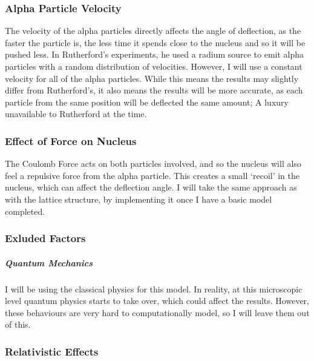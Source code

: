 \documentclass[11pt]{article}
\begin{document}
\hypertarget{alpha-particle-velocity}{%
\subsubsection*{Alpha Particle Velocity}\label{alpha-particle-velocity}}
%
The velocity of the alpha particles directly affects the angle of
deflection, as the faster the particle is, the less time it spends close
to the nucleus and so it will be pushed less. In Rutherford's
experiments, he used a radium source to emit alpha particles with a
random distribution of velocities. However, I will use a constant
velocity for all of the alpha particles. While this means the results
may slightly differ from Rutherford's, it also means the results will be
more accurate, as each particle from the same position will be deflected
the same amount; A luxury unavailable to Rutherford at the time.

\hypertarget{effect-of-force-on-nucleus}{%
\subsubsection*{Effect of Force on
Nucleus}\label{effect-of-force-on-nucleus}}

The Coulomb Force acts on both particles involved, and so the nucleus
will also feel a repulsive force from the alpha particle. This creates a
small `recoil' in the nucleus, which can affect the deflection angle. I
will take the same approach as with the lattice structure, by
implementing it once I have a basic model completed.

\hypertarget{exluded-factors}{%
\subsubsection{Exluded Factors}\label{exluded-factors}}

\hypertarget{quantum-mechanics}{%
\subparagraph{Quantum Mechanics}\label{quantum-mechanics}}

I will be using the classical physics for this model. In reality, at
this microscopic level quantum physics starts to take over, which could
affect the results. However, these behaviours are very hard to
computationally model, so I will leave them out of this.

\hypertarget{relativistic-effects}{%
\subsubsection*{Relativistic Effects}\label{relativistic-effects}}
\end{document}
